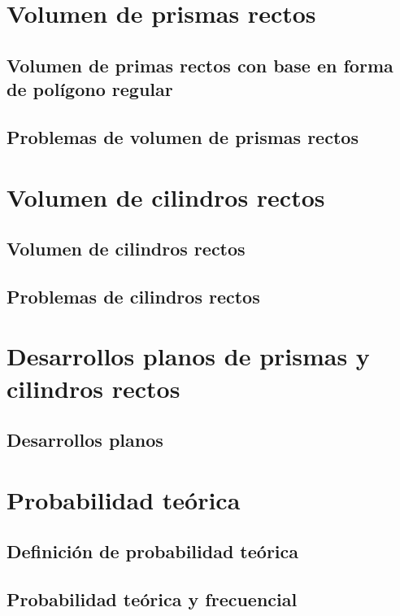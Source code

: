 \documentclass[11pt]{book}
\begin{document}
\newpage \thispagestyle{plain}
\section{Volumen de prismas rectos}
\subsection{Volumen de primas rectos con base en forma de polígono regular}
\subsection{Problemas de volumen de prismas rectos}

\newpage \thispagestyle{plain}
\section{Volumen de cilindros rectos}
\subsection{Volumen de cilindros rectos}
\subsection{Problemas de cilindros rectos}

\newpage \thispagestyle{plain}
\section{Desarrollos planos de prismas y cilindros rectos}
\subsection{Desarrollos planos}

\newpage \thispagestyle{plain}
\section{Probabilidad teórica}
\subsection{Definición de probabilidad teórica}
\subsection{Probabilidad teórica y frecuencial}
\end{document}
